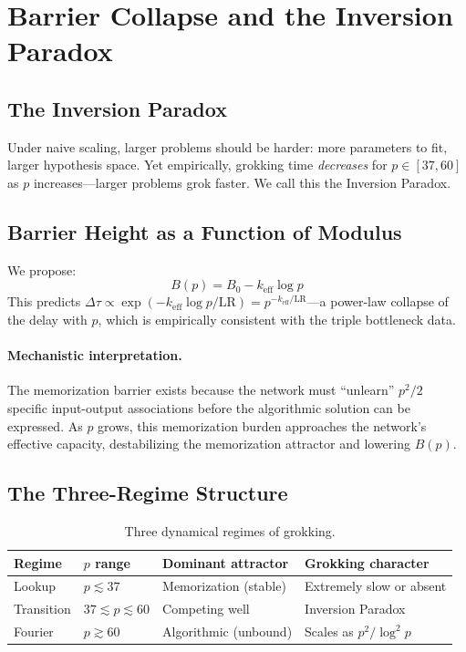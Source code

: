 \documentclass[11pt,twocolumn]{article}
\begin{document}
\section{Barrier Collapse and the Inversion Paradox}
\label{sec:barrier}

\subsection{The Inversion Paradox}

Under naive scaling, larger problems should be harder: more parameters to fit, larger hypothesis space. Yet empirically, grokking time \emph{decreases} for $p \in [37, 60]$ as $p$ increases---larger problems grok faster. We call this the Inversion Paradox.

\subsection{Barrier Height as a Function of Modulus}

We propose:
\begin{equation}
B(p) = B_0 - k_{\mathrm{eff}} \log p
\label{eq:barrier_collapse}
\end{equation}
This predicts $\Delta\tau \propto \exp(-k_{\mathrm{eff}} \log p / \mathrm{LR}) = p^{-k_{\mathrm{eff}}/\mathrm{LR}}$---a power-law collapse of the delay with $p$, which is empirically consistent with the triple bottleneck data.

\paragraph{Mechanistic interpretation.} The memorization barrier exists because the network must ``unlearn'' $p^2/2$ specific input-output associations before the algorithmic solution can be expressed. As $p$ grows, this memorization burden approaches the network's effective capacity, destabilizing the memorization attractor and lowering $B(p)$.

\subsection{The Three-Regime Structure}

\begin{table}[H]
\centering
\small
\begin{tabularx}{\columnwidth}{@{}l l X X@{}}
\toprule
Regime & $p$ range & Dominant attractor & Grokking character \\
\midrule
Lookup & $p \lesssim 37$  & Memorization (stable) & Extremely slow or absent \\
Transition & $37 \lesssim p \lesssim 60$ & Competing well & Inversion Paradox \\
Fourier & $p \gtrsim 60$   & Algorithmic (unbound) & Scales as $p^2/\log^2 p$ \\
\bottomrule
\end{tabularx}
\caption{Three dynamical regimes of grokking.}
\label{tab:regimes}
\end{table}
\end{document}
